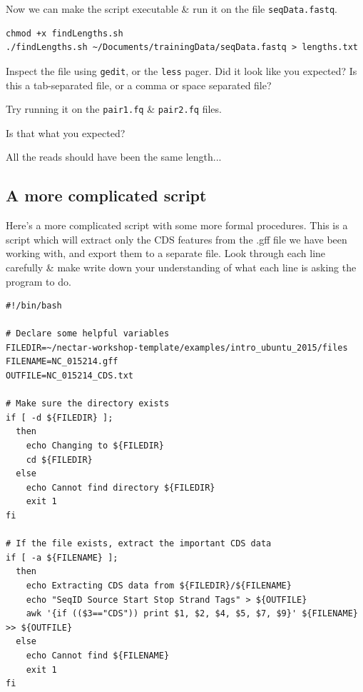 \documentclass[a4paper,12pt,twoside]{memoir}
\begin{document}
\begin{steps}
Now we can make the script executable \& run it on the file \texttt{seqData.fastq}.
\begin{lstlisting}
chmod +x findLengths.sh
./findLengths.sh ~/Documents/trainingData/seqData.fastq > lengths.txt
\end{lstlisting}
\end{steps}

\begin{questions}
Inspect the file using \texttt{gedit}, or the \texttt{less} pager.
Did it look like you expected? 
Is this a tab-separated file, or a comma or space separated file?
\end{questions}

\begin{bonus}
Try running it on the \texttt{pair1.fq} \& \texttt{pair2.fq} files.
\begin{questions}
Is that what you expected?
\begin{answer}
All the reads should have been the same length...
\end{answer}
\end{questions}
\end{bonus}

\clearpage
\subsection*{A more complicated script}

Here's a more complicated script with some more formal procedures.
This is a script which will extract only the CDS features from the .gff file we have been working with, and export them to a separate file.
Look through each line carefully \& make write down your understanding of what each line is asking the program to do.

\begin{lstlisting}
#!/bin/bash

# Declare some helpful variables
FILEDIR=~/nectar-workshop-template/examples/intro_ubuntu_2015/files
FILENAME=NC_015214.gff
OUTFILE=NC_015214_CDS.txt

# Make sure the directory exists
if [ -d ${FILEDIR} ];
  then
    echo Changing to ${FILEDIR}
    cd ${FILEDIR}
  else
    echo Cannot find directory ${FILEDIR}
    exit 1
fi

# If the file exists, extract the important CDS data
if [ -a ${FILENAME} ];
  then
    echo Extracting CDS data from ${FILEDIR}/${FILENAME}
    echo "SeqID Source Start Stop Strand Tags" > ${OUTFILE}
    awk '{if (($3=="CDS")) print $1, $2, $4, $5, $7, $9}' ${FILENAME} >> ${OUTFILE}
  else
    echo Cannot find ${FILENAME}
    exit 1
fi
\end{lstlisting}
\end{document}
